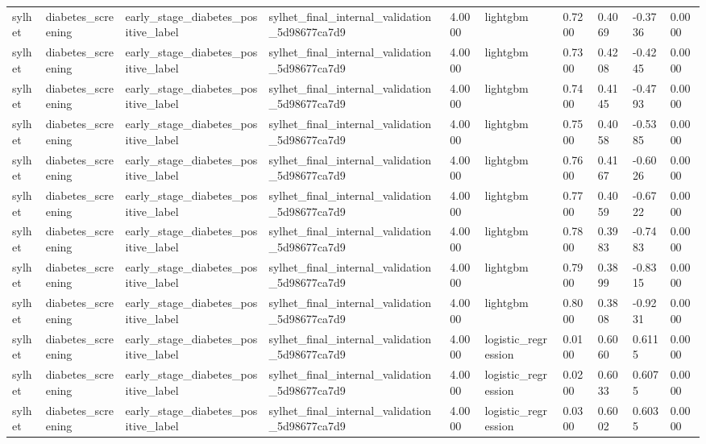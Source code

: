 \begin{tabular}{llllllllll}
sylhet & diabetes\_screening & early\_stage\_diabetes\_positive\_label & sylhet\_final\_internal\_validation\_5d98677ca7d9 & 4.0000 & lightgbm & 0.7200 & 0.4069 & -0.3736 & 0.0000 \\
sylhet & diabetes\_screening & early\_stage\_diabetes\_positive\_label & sylhet\_final\_internal\_validation\_5d98677ca7d9 & 4.0000 & lightgbm & 0.7300 & 0.4208 & -0.4245 & 0.0000 \\
sylhet & diabetes\_screening & early\_stage\_diabetes\_positive\_label & sylhet\_final\_internal\_validation\_5d98677ca7d9 & 4.0000 & lightgbm & 0.7400 & 0.4145 & -0.4793 & 0.0000 \\
sylhet & diabetes\_screening & early\_stage\_diabetes\_positive\_label & sylhet\_final\_internal\_validation\_5d98677ca7d9 & 4.0000 & lightgbm & 0.7500 & 0.4058 & -0.5385 & 0.0000 \\
sylhet & diabetes\_screening & early\_stage\_diabetes\_positive\_label & sylhet\_final\_internal\_validation\_5d98677ca7d9 & 4.0000 & lightgbm & 0.7600 & 0.4167 & -0.6026 & 0.0000 \\
sylhet & diabetes\_screening & early\_stage\_diabetes\_positive\_label & sylhet\_final\_internal\_validation\_5d98677ca7d9 & 4.0000 & lightgbm & 0.7700 & 0.4059 & -0.6722 & 0.0000 \\
sylhet & diabetes\_screening & early\_stage\_diabetes\_positive\_label & sylhet\_final\_internal\_validation\_5d98677ca7d9 & 4.0000 & lightgbm & 0.7800 & 0.3983 & -0.7483 & 0.0000 \\
sylhet & diabetes\_screening & early\_stage\_diabetes\_positive\_label & sylhet\_final\_internal\_validation\_5d98677ca7d9 & 4.0000 & lightgbm & 0.7900 & 0.3899 & -0.8315 & 0.0000 \\
sylhet & diabetes\_screening & early\_stage\_diabetes\_positive\_label & sylhet\_final\_internal\_validation\_5d98677ca7d9 & 4.0000 & lightgbm & 0.8000 & 0.3808 & -0.9231 & 0.0000 \\
sylhet & diabetes\_screening & early\_stage\_diabetes\_positive\_label & sylhet\_final\_internal\_validation\_5d98677ca7d9 & 4.0000 & logistic\_regression & 0.0100 & 0.6060 & 0.6115 & 0.0000 \\
sylhet & diabetes\_screening & early\_stage\_diabetes\_positive\_label & sylhet\_final\_internal\_validation\_5d98677ca7d9 & 4.0000 & logistic\_regression & 0.0200 & 0.6033 & 0.6075 & 0.0000 \\
sylhet & diabetes\_screening & early\_stage\_diabetes\_positive\_label & sylhet\_final\_internal\_validation\_5d98677ca7d9 & 4.0000 & logistic\_regression & 0.0300 & 0.6002 & 0.6035 & 0.0000 \\

\end{tabular}
